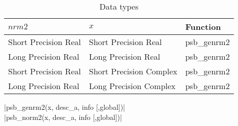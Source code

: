 \begin{table}[h]
\begin{center}
\begin{tabular}{lll}
\hline
$nrm2$ & $x$ & {\bf Function}\\
\hline
Short Precision Real&Short Precision Real & psb\_genrm2 \\
Long Precision Real&Long Precision Real & psb\_genrm2 \\
Short Precision Real&Short Precision Complex & psb\_genrm2 \\
Long Precision Real&Long Precision Complex & psb\_genrm2 \\
\hline
\end{tabular}
\end{center}
\caption{Data types\label{tab:f90nrm2}}
\end{table}

\fortinline|psb_genrm2(x, desc_a, info [,global])|\\
\fortinline|psb_norm2(x, desc_a, info [,global])|\\

